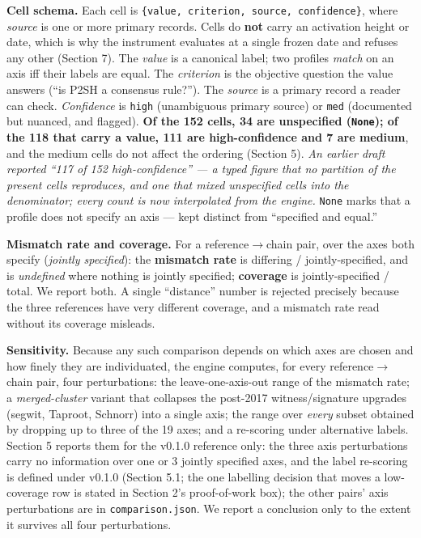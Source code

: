 \documentclass[
]{article}
\begin{document}
\textbf{Cell schema.} Each cell is
\texttt{\{value,\ criterion,\ source,\ confidence\}}, where
\emph{source} is one or more primary records. Cells do \textbf{not}
carry an activation height or date, which is why the instrument
evaluates at a single frozen date and refuses any other (Section 7). The
\emph{value} is a canonical label; two profiles \emph{match} on an axis
iff their labels are equal. The \emph{criterion} is the objective
question the value answers (``is P2SH a consensus rule?''). The
\emph{source} is a primary record a reader can check. \emph{Confidence}
is \texttt{high} (unambiguous primary source) or \texttt{med}
(documented but nuanced, and flagged). \textbf{Of the 152 cells, 34 are
unspecified (\texttt{None}); of the 118 that carry a value, 111 are
high-confidence and 7 are medium}, and the medium cells do not affect
the ordering (Section 5). \emph{An earlier draft reported ``117 of 152
high-confidence'' --- a typed figure that no partition of the present
cells reproduces, and one that mixed unspecified cells into the
denominator; every count is now interpolated from the engine.}
\texttt{None} marks that a profile does not specify an axis --- kept
distinct from ``specified and equal.''

\textbf{Mismatch rate and coverage.} For a reference\(\rightarrow\)chain
pair, over the axes both specify (\emph{jointly specified}): the
\textbf{mismatch rate} is differing / jointly-specified, and is
\emph{undefined} where nothing is jointly specified; \textbf{coverage}
is jointly-specified / total. We report both. A single ``distance''
number is rejected precisely because the three references have very
different coverage, and a mismatch rate read without its coverage
misleads.

\textbf{Sensitivity.} Because any such comparison depends on which axes
are chosen and how finely they are individuated, the engine computes,
for every reference\(\rightarrow\)chain pair, four perturbations: the
leave-one-axis-out range of the mismatch rate; a \emph{merged-cluster}
variant that collapses the post-2017 witness/signature upgrades (segwit,
Taproot, Schnorr) into a single axis; the range over \emph{every} subset
obtained by dropping up to three of the 19 axes; and a re-scoring under
alternative labels. Section 5 reports them for the v0.1.0 reference
only: the three axis perturbations carry no information over one or 3
jointly specified axes, and the label re-scoring is defined under v0.1.0
(Section 5.1; the one labelling decision that moves a low-coverage row
is stated in Section 2's proof-of-work box); the other pairs' axis
perturbations are in \texttt{comparison.json}. We report a conclusion
only to the extent it survives all four perturbations.
\end{document}
